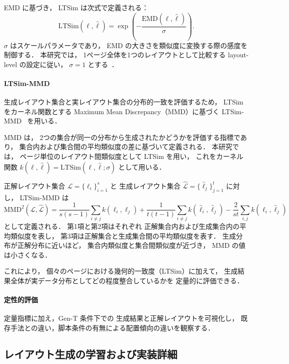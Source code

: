 \documentclass[a4j,12pt,dvipdfmx]{jsreport}
\begin{document}
EMD に基づき，
LTSim は次式で定義される：
\begin{equation}
  \mathrm{LTSim}(\ell,\hat{\ell})
  =
  \exp\!\left(-\frac{\mathrm{EMD}(\ell,\hat{\ell})}{\sigma}\right).
\end{equation}
$\sigma$ はスケールパラメータであり，
EMD の大きさを類似度に変換する際の感度を制御する．
本研究では，
1ページ全体を1つのレイアウトとして比較する
layout-level の設定に従い，
$\sigma=1$ とする~\cite{otani_ltsim_2024}．


\paragraph{LTSim-MMD}
生成レイアウト集合と実レイアウト集合の分布的一致を評価するため，
LTSim をカーネル関数とする
Maximum Mean Discrepancy（MMD）に基づく
LTSim-MMD~\cite{otani_ltsim_2024} を用いる．

MMD は，
2つの集合が同一の分布から生成されたかどうかを評価する指標であり，
集合内および集合間の平均類似度の差に基づいて定義される．
本研究では，
ページ単位のレイアウト間類似度として LTSim を用い，
これをカーネル関数
$k(\ell,\hat{\ell})=\mathrm{LTSim}(\ell,\hat{\ell};\sigma)$
として用いる．

正解レイアウト集合 $\mathcal{L}=\{\ell_i\}_{i=1}^{s}$ と
生成レイアウト集合 $\hat{\mathcal{L}}=\{\hat{\ell}_j\}_{j=1}^{t}$ に対し，
LTSim-MMD は
\begin{equation}
  \mathrm{MMD}^2(\mathcal{L},\hat{\mathcal{L}})
  =
  \frac{1}{s(s-1)}\sum_{i\neq j} k(\ell_i,\ell_j)
  +
  \frac{1}{t(t-1)}\sum_{i\neq j} k(\hat{\ell}_i,\hat{\ell}_j)
  -
  \frac{2}{st}\sum_{i,j} k(\ell_i,\hat{\ell}_j)
\end{equation}
として定義される．
第1項と第2項はそれぞれ
正解集合内および生成集合内の平均類似度を表し，
第3項は正解集合と生成集合間の平均類似度を表す．
生成分布が正解分布に近いほど，
集合内類似度と集合間類似度が近づき，
MMD の値は小さくなる．

これにより，
個々のページにおける幾何的一致度（LTSim）に加えて，
生成結果全体が実データ分布としてどの程度整合しているかを
定量的に評価できる．

\paragraph{定性的評価}
定量指標に加え，Gen-T 条件下での
生成結果と正解レイアウトを可視化し，
既存手法との違い，脚本条件の有無による配置傾向の違いを観察する．

\subsection{レイアウト生成の学習および実装詳細}
\end{document}
